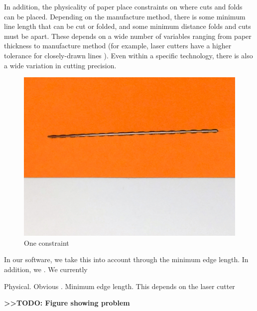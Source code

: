 In addition, the physicality of paper place constraints on where cuts
and folds can be placed. Depending on the manufacture method, there is
some minimum line length that can be cut or folded, and some minimum
distance folds and cuts must be apart. These depends on a wide number of
variables ranging from paper thickness to manufacture method (for
example, laser cutters have a higher tolerance for closely-drawn lines
). Even within a specific technology, there is also a wide variation in
cutting precision.

\begin{figure}[htbp]
\centering
\includegraphics{figures/45_Tech_Constraints/tooclosecuts.jpg}
\caption{One constraint}
\end{figure}

In our software, we take this into account through the minimum edge
length. In addition, we . We currently

Physical. Obvious . Minimum edge length. This depends on the laser
cutter

\textbf{\textgreater{}\textgreater{}TODO: Figure showing problem}
